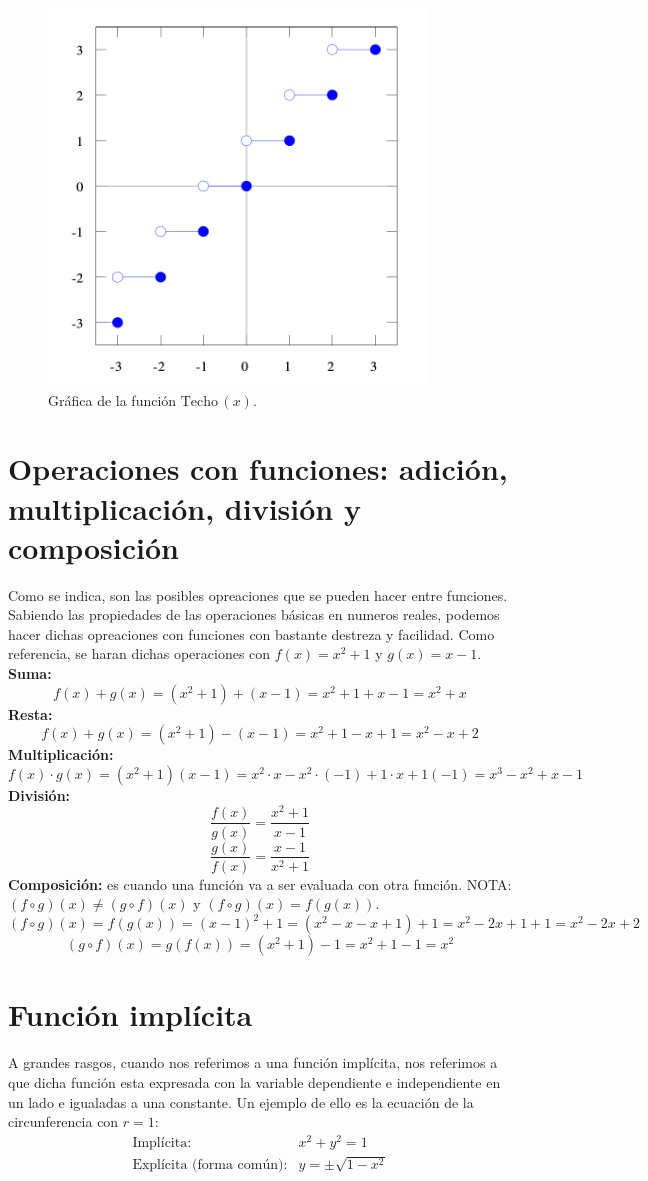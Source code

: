 \documentclass[letterpaper, 12pt]{article}
\begin{document}
        \begin{figure}[H]
            \centering
            \includegraphics[width=10cm]{piso.png}
            \caption{Gráfica de la función \(\text{Techo}\,(x)\).}
        \end{figure}
        \section{Operaciones con funciones: adición, multiplicación, división y composición}
        Como se indica, son las posibles opreaciones que se pueden hacer entre funciones. Sabiendo las propiedades de las operaciones básicas en numeros reales, podemos hacer dichas opreaciones con funciones con bastante destreza y facilidad. Como referencia, se haran 
        dichas operaciones con \(f(x)=x^2+1\) y \(g(x)=x-1\).
        \\\newline \textbf{Suma: }
        \[f(x)+g(x)=(x^2+1)+(x-1)=x^2+1+x-1=x^2+x\]
        \textbf{Resta: }
        \[f(x)+g(x)=(x^2+1)-(x-1)=x^2+1-x+1=x^2-x+2\]
        \textbf{Multiplicación: }
        \[f(x)\cdot g(x)=(x^2+1)(x-1)=x^2\cdot x-x^2\cdot(-1)+1\cdot x+1(-1)=x^3-x^2+x-1\]
        \textbf{División: }
        \[\frac{f(x)}{g(x)}=\frac{x^2+1}{x-1}\]
        \[\frac{g(x)}{f(x)}=\frac{x-1}{x^2+1}\]
        \textbf{Composición: }es cuando una función va a ser evaluada con otra función. NOTA: \((f\circ g)(x)\neq (g\circ \!f)(x)\) y \((f\circ g)(x)=f(g(x))\).
        \[(f\circ g)(x)=f(g(x))=(x-1)^2+1=(x^2-x-x+1)+1=x^2-2x+1+1=x^2-2x+2\] 
        \[(g\circ \!f)(x)=g(f(x))=(x^2+1)-1=x^2+1-1=x^2\]
        \section{Función implícita}
        A grandes rasgos, cuando nos referimos a una función implícita, nos referimos a que dicha función esta expresada con la variable dependiente e independiente en un lado e igualadas a una constante. Un ejemplo de ello es la ecuación de la circunferencia con \(r=1\):
        \[\begin{matrix}
            \text{Implícita:}&x^2+y^2=1\\
            \text{Explícita (forma común):}&y=\pm\sqrt{1-x^2}
        \end{matrix}\]
\end{document}
